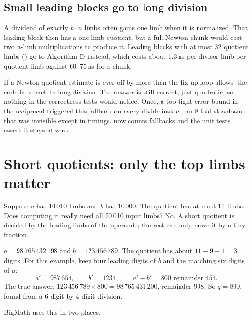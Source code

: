 \subsection{Small leading blocks go to long division}

A dividend of exactly $k \cdot n$ limbs often gains one limb when it is normalized. That
leading block then has a one-limb quotient, but a full Newton chunk would cost two $n$-limb
multiplications to produce it. Leading blocks with at most 32 quotient limbs
() go to Algorithm D instead, which costs about 1.3\,ns
per divisor limb per quotient limb against 60--75\,ns for a chunk.

\begin{pitfall}
If a Newton quotient estimate is ever off by more than the fix-up loop allows, the code
falls back to long division. The answer is still correct, just quadratic, so nothing in the
correctness tests would notice. Once, a too-tight error bound in the reciprocal triggered
this fallback on every divide inside , an 8-fold slowdown that was invisible
except in timings.  now counts fallbacks and the unit
tests assert it stays at zero.
\end{pitfall}

\section{Short quotients: only the top limbs matter}
\label{sec:toplimbs}

Suppose $a$ has 10\,010 limbs and $b$ has 10\,000. The quotient has at most 11 limbs. Does
computing it really need all 20\,010 input limbs? No. A short quotient is decided by the
leading limbs of the operands; the rest can only move it by a tiny fraction.

\begin{example}
$a = 98\,765\,432\,198$ and $b = 123\,456\,789$. The quotient has about $11 - 9 + 1 = 3$ digits.
For this example, keep four leading digits of $b$ and the matching six digits of $a$:
\[
a' = 987\,654, \qquad b' = 1234, \qquad a' \div b' = 800 \text{ remainder } 454 .
\]
The true answer: $123\,456\,789 \times 800 = 98\,765\,431\,200$, remainder $998$. So $q = 800$,
found from a 6-digit by 4-digit division.
\end{example}

BigMath uses this in two places.

